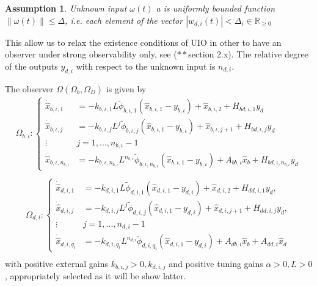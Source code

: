 \documentclass[11pt,letterpaper,twoside,openright]{report}
\providecommand{\norm}[1]{\lVert#1\rVert}
\newtheorem{assumtion}{Assumption}[chapter]
\begin{document}
\begin{assumtion}\label{Assum: CH4 omega}
	Unknown input $\omega(t)$ a is uniformly bounded function $\norm{\omega(t)}\leq \Delta$, i.e. each element of the vector $|w_{d,i}(t)|< \Delta_{i} \in \mathbb{R}_{\geq 0}$
\end{assumtion}
This allow us to relax the existence conditions of UIO in other to have an observer under strong observability only, see ($**$section 2.x). The relative degree of the outputs $y_{d,i}$ with respect to the unknown input is $n_{d,i}$.

The observer $\Omega(\Omega_b,\Omega_D)$ is given by
\begin{equation}
	\begin{split}\label{ecu: CH4 Omega_b}
		\Omega_{b,\iota}: \left\{
		\begin{array}{rl}
			\dot{\hat{x}}_{b,\iota,1} &= -k_{b,\iota,1}L \tilde{\phi}_{b,\iota,1}( \hat{x}_{b,\iota,1}-y_{b,\iota} ) + \hat{x}_{b,\iota,2} + H_{bd,\iota,1}y_d \\
			\dot{\hat{x}}_{b,\iota,j} &= -k_{b,\iota,j}L^{j} \tilde{\phi}_{b,\iota,j}( \hat{x}_{b,\iota,1}-y_{b,\iota} ) + \hat{x}_{b,\iota,j+1} + H_{bd,\iota,j}y_d  \\
			\vdots \quad & j=1,...,n_{b,\iota}-1\\
			\dot{\hat{x}}_{b,\iota,n_{b,\iota}} &= -k_{b,\iota,n_{b,\iota}}L^{n_{b,\iota}} \tilde{\phi}_{b,\iota,n_{b,\iota}}( \hat{x}_{b,\iota,1}-y_{b,\iota} ) + A_{bb,\iota}\hat{x}_{b}  + H_{bd,\iota,n_{b,\iota}}y_d 
		\end{array}
		\right. \\
	\end{split}
\end{equation}
\begin{equation}
	\begin{split}\label{ecu: CH4 Omega_d}
		\Omega_{d,i}: \left\{
		\begin{array}{rl}
			\dot{\hat{x}}_{d,i,1} &= -k_{d,i,1}L \tilde{\phi}_{d,i,1}( \hat{x}_{d,i,1}-y_{d,i} ) + \hat{x}_{d,i,2} + H_{dd,i,1}y_d,  \\
			\dot{\hat{x}}_{d,i,j} &= -k_{d,i,j}L^{j}\tilde{\phi}_{d,i,j}( \hat{x}_{d,i,1}-y_{d,i} ) + \hat{x}_{d,i,j+1} + H_{dd,i,j}y_d,\\
			\vdots \quad & j=1,...,n_{d,i}-1\\
			\dot{\hat{x}}_{d,i,q_i} &= -k_{d,i,q_i}L^{n_{d,i}} \tilde{\phi}_{d,i,q_i}( \hat{x}_{d,i,1}-y_{d,i} ) + A_{db,i}\hat{x}_b + A_{dd,i}\hat{x}_d
		\end{array}
		\right. \\
	\end{split}
\end{equation}
with positive external gains $k_{b,\iota,j}>0,k_{d,i,j}$ and positive tuning gains $\alpha>0,L >0$, appropriately selected as it will be show latter. 
\end{document}
